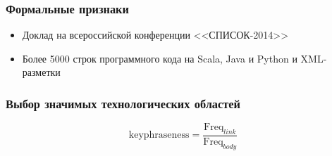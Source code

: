 \documentclass{beamer}
\let\otp\titlepage
\renewcommand{\titlepage}{\otp\addtocounter{framenumber}{-1}}
\begin{document}
\begin{frame}\frametitle{Формальные признаки}
\begin{itemize}
    \item Доклад на всероссийской конференции <<СПИСОК-2014>>
    \item Более 5000 строк программного кода на Scala, Java и Python и XML-разметки
\end{itemize}
\end{frame}


  {
\frame{\titlepage}
}



\begin{frame}\frametitle{Выбор значимых технологических областей}
$$\textrm{keyphraseness}=\frac{\textrm{Freq}_{link}}{\textrm{Freq}_{body}}$$
\end{frame}
\end{document}
